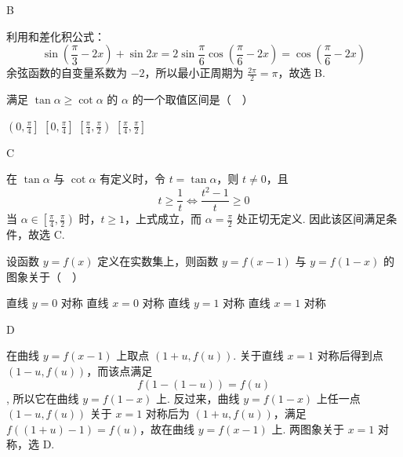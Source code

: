 \begin{answer}
B
\end{answer}

\begin{solution}
利用和差化积公式：
\[
\sin\left(\frac\pi3-2x\right)+\sin2x
=2\sin\frac\pi6\cos\left(\frac\pi6-2x\right)
=\cos\left(\frac\pi6-2x\right)
\]
余弦函数的自变量系数为 \(-2\)，所以最小正周期为 \(\frac{2\pi}{2}=\pi\)，故选 B.
\end{solution}

\begin{problem}
满足 \(\tan \alpha \geqslant \cot \alpha\) 的 \(\alpha\) 的一个取值区间是（\(\quad\)）

\choices
    {\(\left(0, \frac{\pi}{4}\right]\)}
    {\(\left[0, \frac{\pi}{4}\right]\)}
    {\(\left[\frac{\pi}{4}, \frac{\pi}{2}\right)\)}
    {\(\left[\frac{\pi}{4}, \frac{\pi}{2}\right]\)}

\end{problem}

\begin{answer}
C
\end{answer}

\begin{solution}
在 \(\tan\alpha\) 与 \(\cot\alpha\) 有定义时，令 \(t=\tan\alpha\)，则 \(t\ne0\)，且
\[
t\geqslant\frac1t
\iff \frac{t^2-1}{t}\geqslant0
\]
当 \(\alpha\in\left[\frac\pi4,\frac\pi2\right)\) 时，\(t\geqslant1\)，上式成立，而 \(\alpha=\frac\pi2\) 处正切无定义. 因此该区间满足条件，故选 C.
\end{solution}

\begin{problem}
设函数 \(y = f(x)\) 定义在实数集上，则函数 \(y = f(x - 1)\) 与 \(y = f(1 - x)\) 的图象关于（\(\quad\)）

\choices
    {直线 \(y = 0\) 对称}
    {直线 \(x = 0\) 对称}
    {直线 \(y = 1\) 对称}
    {直线 \(x = 1\) 对称}

\end{problem}

\begin{answer}
D
\end{answer}

\begin{solution}
在曲线 \(y=f(x-1)\) 上取点 \((1+u,f(u))\). 关于直线 \(x=1\) 对称后得到点 \((1-u,f(u))\)，而该点满足
\[
f(1-(1-u))=f(u)
\],
所以它在曲线 \(y=f(1-x)\) 上. 反过来，曲线 \(y=f(1-x)\) 上任一点 \((1-u,f(u))\) 关于 \(x=1\) 对称后为 \((1+u,f(u))\)，满足 \(f((1+u)-1)=f(u)\)，故在曲线 \(y=f(x-1)\) 上. 两图象关于 \(x=1\) 对称，选 D.
\end{solution}

